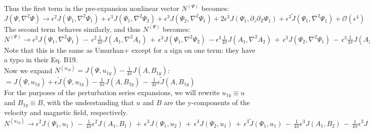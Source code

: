 \documentclass[letterpaper,12pt]{article}
\begin{document}
Thus the first term in the pre-expansion nonlinear vector $N^{(\Psi)}$ becomes: \\

$J(\Psi, \nabla^2\Psi) \to \epsilon^2 J(\Psi_1, \nabla^2 \Psi_1) + \epsilon^3 J(\Psi_1, \nabla^2\Psi_2) + \epsilon^3 J(\Psi_2, \nabla^2\Psi_1) + 2\epsilon^3 J(\Psi_1, \partial_z\partial_Z \Psi_1) + \epsilon^3\widetilde{J}(\Psi_1, \nabla^2 \Psi_1) + \mathcal{O}(\epsilon^4)$ \\

The second term behaves similarly, and thus $N^{(\Psi)}$ becomes: \\

$N^{(\Psi)} \to \epsilon^2 J(\Psi_1, \nabla^2 \Psi_1) \,-\, \epsilon^2 \frac{1}{4\pi}J(A_1, \nabla^2 A_1) \,+\, \epsilon^3 J(\Psi_1, \nabla^2\Psi_2) \, - \epsilon^3\frac{1}{4\pi}J(A_1, \nabla^2 A_2) \,+\, \epsilon^3 J(\Psi_2, \nabla^2\Psi_1) \, - \, \epsilon^3 \frac{1}{4\pi}J(A_2, \nabla^2 A_1) \,+\, 2\epsilon^3 J(\Psi_1, \partial_z\partial_Z \Psi_1) \, - \, 2\epsilon^3 \frac{1}{4\pi}J(A_1, \partial_z\partial_Z A_1) \,+\, \epsilon^3\widetilde{J}(\Psi_1, \nabla^2 \Psi_1) \, - \, \epsilon^3 \frac{1}{4\pi}\widetilde{J}(A_1, \nabla^2 A_1) \, + \, \mathcal{O}(\epsilon^4)$ \\

Note that this is the same as Umurhan+ except for a sign on one term: they have a typo in their Eq. B19. \\

Now we expand $N^{(u_{1y})} = J(\Psi, u_{1y}) - \frac{1}{4\pi} J(A, B_{1y})$: \\

$= J(\Psi, u_{1y}) + \epsilon \widetilde{J}(\Psi, u_{1y}) - \frac{1}{4\pi}J(A, B_{1y}) \, - \, \frac{1}{4\pi}\epsilon \widetilde{J}(A, B_{1y})$ \\

For the purposes of the perturbation series expansions, we will rewrite $u_{1y} \equiv u$ and $B_{1y} \equiv B$, with the understanding that $u$ and $B$ are the y-components of the velocity and magnetic field, respectively. \\

$N^{(u_{1y})} \to \epsilon^2 J(\Psi_1, u_1) \, - \, \frac{1}{4\pi} \epsilon^2 J(A_1, B_1) \, + \, \epsilon^3 J(\Psi_1, u_2) \, + \, \epsilon^3 J(\Psi_2, u_1) \, + \, \epsilon^3 \widetilde{J}(\Psi_1, u_1) \, - \, \frac{1}{4\pi} \epsilon^3 J(A_1, B_2) \, - \, \frac{1}{4\pi} \epsilon^3 J(A_2, B_1) \, - \, \frac{1}{4\pi}\epsilon^3 \widetilde{J}(A_1, B_1) \, + \, \mathcal{O}(\epsilon^4)$ \\
\end{document}
